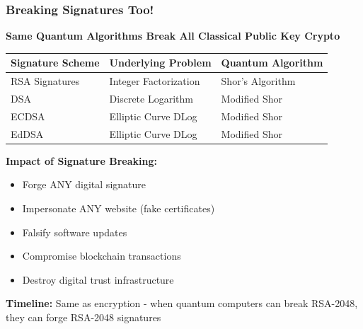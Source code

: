 \documentclass[aspectratio=169,10pt]{beamer}
\newcommand{\teaching}[1]{}
\newcommand{\slideheader}[1]{\frametitle{#1}}
\theoremstyle{plain}
\begin{document}
\begin{frame}
  \slideheader{Breaking Signatures Too!}
  
  \begin{center}
    \textbf{\large Same Quantum Algorithms Break All Classical Public Key Crypto}
  \end{center}
  
  \vspace{0.5cm}
  
  \begin{table}
    \centering
    \begin{tabular}{|l|l|l|}
      \hline
      \textbf{Signature Scheme} & \textbf{Underlying Problem} & \textbf{Quantum Algorithm} \\
      \hline
      RSA Signatures & Integer Factorization & Shor's Algorithm \\
      DSA & Discrete Logarithm & Modified Shor \\
      ECDSA & Elliptic Curve DLog & Modified Shor \\
      EdDSA & Elliptic Curve DLog & Modified Shor \\
      \hline
    \end{tabular}
  \end{table}
  
  \vspace{0.5cm}
  
  \begin{redBox}
    \textbf{Impact of Signature Breaking:}
    \begin{itemize}
      \item Forge ANY digital signature
      \item Impersonate ANY website (fake certificates)
      \item Falsify software updates
      \item Compromise blockchain transactions
      \item Destroy digital trust infrastructure
    \end{itemize}
  \end{redBox}
  
  \vspace{0.3cm}
  
  \begin{greenBox}
    \textbf{Timeline:} Same as encryption - when quantum computers can break RSA-2048, they can forge RSA-2048 signatures
  \end{greenBox}
  
  \teaching{Emphasize complete failure of classical public key crypto}
\end{frame}
\end{document}
